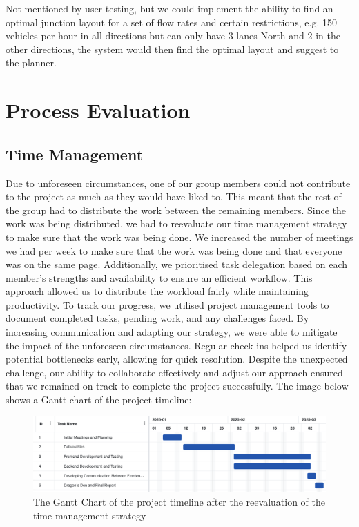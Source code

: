 \documentclass{article}
\begin{document}
    Not mentioned by user testing, but we could implement the ability to find an optimal junction layout for a set of
    flow rates and certain restrictions, e.g. 150 vehicles per hour in all directions but can only have 3 lanes North and
    2 in the other directions, the system would then find the optimal layout and suggest to the planner.

    \section{Process Evaluation}

    \subsection{Time Management}

    Due to unforeseen circumstances, one of our group members could not contribute to the project as much as they would have liked to. This meant that the rest of the group had to distribute 
    the work between the remaining members. Since the work was being distributed, we had to reevaluate our time management strategy to make sure that the work was being done.
    We increased the number of meetings we had per week to make sure that the work was being done and that everyone was on the same page.  Additionally, we prioritised task delegation based on each member’s strengths
    and availability to ensure an efficient workflow. This approach allowed us to distribute the workload fairly while maintaining productivity. To track our progress, we utilised project management tools to document
    completed tasks, pending work, and any challenges faced. By increasing communication and adapting our strategy, we were able to mitigate the impact of the unforeseen circumstances. Regular check-ins helped us identify potential 
    bottlenecks early, allowing for quick resolution. Despite the unexpected challenge, our ability to collaborate effectively and adjust our approach ensured that we remained on track to complete the project successfully. The image 
    below shows a Gantt chart of the project timeline:

    \begin{figure}[H]
        \centering
        \includegraphics[width=\textwidth]{ganttChart}
        \caption{The Gantt Chart of the project timeline after the reevaluation of the time management strategy}
        \label{fig:ganttChart}
    \end{figure}
\end{document}
